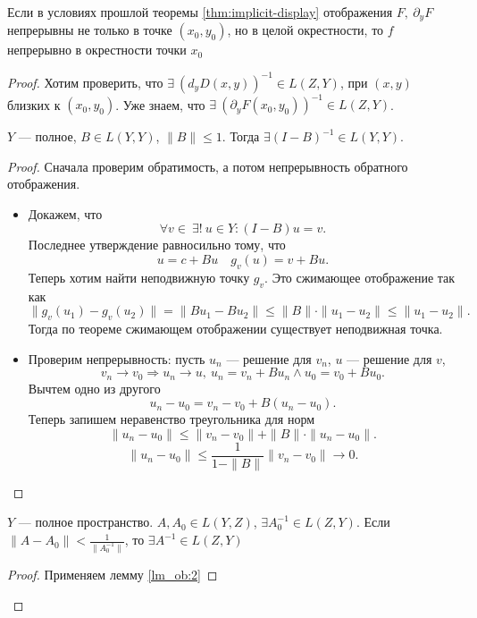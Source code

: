 \begin{thm}
	Если в условиях прошлой теоремы \ref{thm:implicit-display} отображения  $ F, ~\partial _yF$ непрерывны не только в точке $ (x_0, y_0)$, но в целой окрестности, то $ f$  непрерывно в окрестности точки  $ x_0$
\end{thm}
\begin{proof}
    Хотим проверить, что $ \exists ~ (d_y D(x, y))^{-1} \in L(Z, Y)$, при $ (x, y)$ близких к $ (x_0, y_0)$.
	Уже знаем, что $ \exists ~\left( \partial _yF(x_0, y_0) \right)^{-1} \in L(Z, Y)$.
    \begin{lm}\label{lm_ob:2}
	$ Y$ --- полное,  $ B \in L(Y, Y)$, $ \| B \|  \le  1 $. Тогда $ \exists ( I - B)^{-1} \in L(Y, Y)$.
    \end{lm}
    \begin{proof}
		Сначала проверим обратимость, а потом непрерывность обратного отображения.
		\begin{itemize}
			\item
	Докажем, что
        \[
	    \forall v \in ~ \exists ! ~ u \in Y \colon (I-B) u = v  
        .\] 
	Последнее утверждение равносильно тому, что
	\[
	    u = c + Bu \quad g_v(u) = v + Bu
	.\] 
	Теперь хотим найти неподвижную точку $ g_v$.
	Это сжимающее отображение так как
	\[
	    \|  g_v(u_1) - g_v(u_2) \| = \| Bu_1 - Bu_2 \| \le \| B \| \cdot \| u_1-u_2 \| \le \| u_1 - u_2 \| 
	.\] 
	Тогда по теореме сжимающем отображении существует неподвижная точка.
	\item Проверим непрерывность:
		пусть $ u_n$ --- решение для  $ v_n$,  $ u$ --- решение для  $ v$,
	\[
	v_n \to  v_0 \Longrightarrow u_n \to  u, ~ u_n = v_n + B u_n \wedge  u_0  = v_0 + Bu_0
	.\] 
	Вычтем одно из другого
	$$ u_n  - u_0 = v_n - v_0 + B\left( u_n - u_0 \right) .$$
	Теперь запишем неравенство треугольника для норм
	\[
	\| u_n - u_0 \| \le \| v_n - v_0 \| + \| B \| \cdot \|  u_n-u_0 \|    
	.\] 
	\[
	\|  u_n - u_0 \| \le \frac{1}{1-\|  B \| }  \|  v_n - v_0 \| \to  0
	.\] 
		\end{itemize}
    \end{proof}
    \begin{lm}\label{lm_obr:1}
	$ Y $ --- полное пространство. $ A, A_0 \in  L(Y, Z)$, $ \exists  A_0^{-1} \in L(Z, Y)$. Если $ \| A-A_0 \| < \frac{1}{\| A_0^{-1} \| }$, то $\exists  A^{-1} \in L(Z, Y)$ 
    \end{lm}
    \begin{proof}
	Применяем лемму \ref{lm_ob:2}

\end{proof}
\end{proof}
